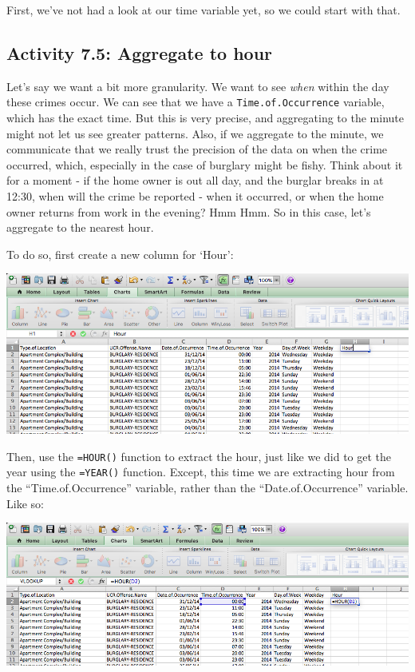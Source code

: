 \documentclass[
]{book}
\begin{document}
First, we've not had a look at our time variable yet, so we could start with that.

\hypertarget{activity-7.5-aggregate-to-hour}{%
\subsection{Activity 7.5: Aggregate to hour}\label{activity-7.5-aggregate-to-hour}}

Let's say we want a bit more granularity. We want to see \emph{when} within the day these crimes occur. We can see that we have a \texttt{Time.of.Occurrence} variable, which has the exact time. But this is very precise, and aggregating to the minute might not let us see greater patterns. Also, if we aggregate to the minute, we communicate that we really trust the precision of the data on when the crime occurred, which, especially in the case of burglary might be fishy. Think about it for a moment - if the home owner is out all day, and the burglar breaks in at 12:30, when will the crime be reported - when it occurred, or when the home owner returns from work in the evening? Hmm Hmm. So in this case, let's aggregate to the nearest hour.

To do so, first create a new column for `Hour':

\includegraphics{imgs/hour_1.png}

Then, use the \texttt{=HOUR()} function to extract the hour, just like we did to get the year using the \texttt{=YEAR()} function. Except, this time we are extracting hour from the ``Time.of.Occurrence'' variable, rather than the ``Date.of.Occurrence'' variable. Like so:

\includegraphics{imgs/hour_2.png}
\end{document}

